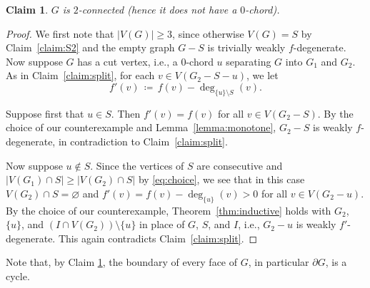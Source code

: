 \documentclass[11pt]{article}
\theoremstyle{slantthm}
\newtheorem{claim}{Claim}%
\numberwithin{equation}{section}
\theoremstyle{definition}
\renewcommand{\geq}{\geqslant}
\newcommand{\defeq}{\coloneqq}
\newcommand{\bemph}[1]{{\normalfont#1}}
\newcommand{\ep}[1]{\bemph{(}#1\bemph{)}}
\numberwithin{equation}{section}
\newcommand{\0}{\varnothing}
\newcommand{\set}[1]{\{#1\}}
\begin{document}
\begin{claim}\label{claim:2conn}
    $G$ is $2$-connected \ep{hence it does not have a $0$-chord}.
\end{claim}
\begin{proof}
    We first note that $|V(G)| \geq 3$, since otherwise $V(G) = S$ by Claim~\ref{claim:S2} and the empty graph $G - S$ is trivially weakly $f$-degenerate. Now suppose $G$ has a cut vertex, i.e., a $0$-chord $u$ separating $G$ into $G_1$ and $G_2$. %
    As in Claim~\ref{claim:split}, for each $v \in V(G_2 - S - u)$, we let
    \[
        f'(v) \,\defeq\, f(v) - \deg_{\set{u} \setminus S} (v). %
    \]


    Suppose first that  $u \in S$. Then $f'(v) = f(v)$ for all $v \in V(G_2 - S)$. By the choice of our counterexample and Lemma~\ref{lemma:monotone}, $G_2 - S$ is weakly $f$-degenerate, in contradiction to Claim~\ref{claim:split}. %

    Now suppose $u \notin S$. Since the vertices of $S$ are consecutive and $|V(G_1) \cap S| \geq |V(G_2) \cap S|$ by \eqref{eq:choice}, we see that in this case $V(G_2) \cap S = \0$ and $f'(v) = f(v) - \deg_{\set{u}}(v) > 0$ for all $v \in V(G_2 - u)$. By the choice of our counterexample, Theorem~\ref{thm:inductive} holds with $G_2$, $\set{u}$, and $(I \cap V(G_2)) \setminus \set{u}$ in place of $G$, $S$, and $I$, i.e., $G_2 - u$ is weakly $f'$-degenerate. This again contradicts Claim~\ref{claim:split}.
\end{proof}

    Note that, by Claim \ref{claim:2conn}, the boundary of every face of $G$, in particular $\partial G$, is a cycle.
\end{document}
